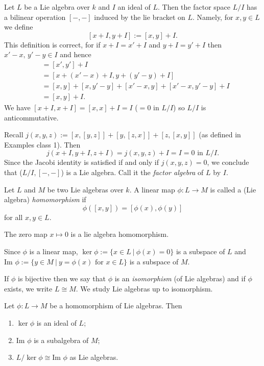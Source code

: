 Let $L$ be a Lie algebra over $k$ and $I$ an ideal of $L$. Then the factor space $L/I$ has a bilinear operation $[-,-]$ induced by the lie bracket on $L$. Namely, for $x,y \in L$ we define
\[
  [x + I, y + I] := [x, y] + I.
\]
This definition is correct, for if $x + I = x' + I$ and $y + I = y' + I$ then $x' - x,\, y' - y \in I$ and hence
\begin{align*}
  [x' + I, y' + I] &= [x', y'] + I\\
                   &= [x + (x' - x) + I, y + (y' - y) + I] \\
                   &= [x, y] + [x, y' - y] + [x' - x, y] + [x' - x, y' - y] + I\\
                   &= [x, y] + I.
\end{align*}
We have $[x + I, x + I] = [x, x] + I = I$ ($ = 0 \text{ in } L/I$) so $L/I$ is anticommutative.

Recall $j(x, y, z) := [x, [y, z]] + [y, [z, x]] + [z, [x, y]]$ (as defined in Examples class 1). Then
\[
  j(x + I, y + I, z + I) = j(x, y, z) + I = I = 0 \text{ in } L/I.
\]
Since the Jacobi identity is satisfied if and only if $j(x, y, z) = 0$, we conclude that ($L/I, [-,-]$) is a Lie algebra. Call it the \emph{factor algebra} of $L$ by $I$.

\begin{definition}
  Let $L$ and $M$ be two Lie algebras over $k$. A linear map $\phi : L \to M$ is called a (Lie algebra) \emph{homomorphism} if
  \[
    \phi([x, y]) = [\phi(x), \phi(y)]
  \]
  for all $x, y \in L$.
\end{definition}

\begin{example}
  The zero map $x \mapsto 0$ is a lie algebra homomorphism.
\end{example}

Since $\phi$ is a linear map, $\ker\phi := \{ x \in L\ |\ \phi(x) = 0 \}$ is a subspace of $L$ and $\text{Im } \phi := \{ y \in M\ |\ y = \phi(x) \text{ for } x \in L \}$ is a subspace of $M$.

If $\phi$ is bijective then we say that $\phi$ is an \emph{isomorphism} (of Lie algebras) and if $\phi$ exists, we write $L \cong M$. We study Lie algebras up to isomorphism.

\begin{theorem}[On isomorphisms]
  Let $\phi : L \to M$ be a homomorphism of Lie algebras. Then
  \begin{enumerate}
    \item $\ker\phi$ is an ideal of $L$;
    \item $\text{Im }\phi$ is a subalgebra of $M$;
    \item $L/\ker\phi \cong \text{Im }\phi$ as Lie algebras.
  \end{enumerate}
\end{theorem}

